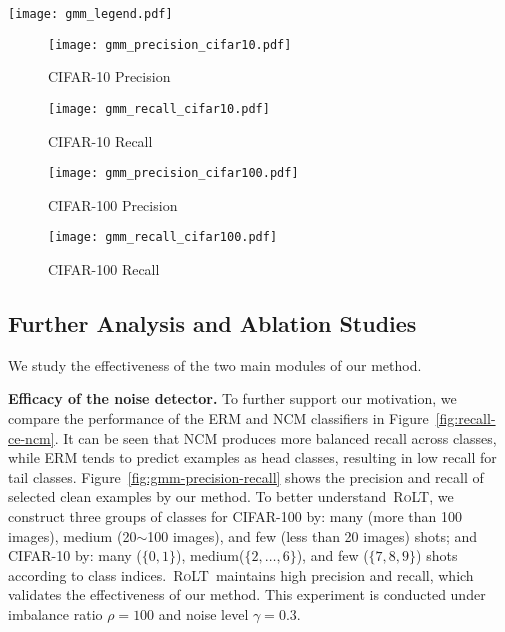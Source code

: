 \documentclass{article}
\def\algo{{\textsc{RoLT}}}
\begin{document}
\vspace{-0.25cm}
\begin{figure*}[h]
    \centering
    \texttt{[image: gmm\_legend.pdf]}
    
    \begin{subfigure}[b]{0.24\textwidth}
        \centering
        \texttt{[image: gmm\_precision\_cifar10.pdf]}
        \caption{CIFAR-10 Precision}
        \label{fig:gmm_precision_cifar10}
    \end{subfigure}
    \begin{subfigure}[b]{0.24\textwidth}
        \centering
        \texttt{[image: gmm\_recall\_cifar10.pdf]} 
        \caption{CIFAR-10 Recall}\label{fig:gmm_recall_cifar10}
    \end{subfigure}
    \begin{subfigure}[b]{0.24\textwidth}
        \centering
        \texttt{[image: gmm\_precision\_cifar100.pdf]} 
        \caption{CIFAR-100 Precision}\label{fig:gmm_precision_cifar100}
    \end{subfigure}
    \begin{subfigure}[b]{0.24\textwidth}
        \centering
        \texttt{[image: gmm\_recall\_cifar100.pdf]} 
        \caption{CIFAR-100 Recall}\label{fig:gmm_recall_cifar100}
    \end{subfigure}
    \caption{Precision and Recall of selected clean examples by our method.}
    \label{fig:gmm-precision-recall}
\end{figure*}
\vspace{-0.2cm}




\subsection{Further Analysis and Ablation Studies}
We study the effectiveness of the two main modules of our method.

\textbf{Efficacy of the noise detector.}
To further support our motivation, we compare the performance of the ERM and NCM classifiers in Figure~\ref{fig:recall-ce-ncm}. It can be seen that NCM produces more balanced recall across classes, while ERM tends to predict examples as head classes, resulting in low recall for tail classes. Figure~\ref{fig:gmm-precision-recall} shows the precision and recall of selected clean examples by our method. To better understand~\algo, we construct three groups of classes for CIFAR-100 by: many (more than 100 images), medium (20$\sim$100 images), and few (less than 20 images) shots; and CIFAR-10 by: many ($\{0,1\}$), medium($\{2,\dots,6\}$), and few ($\{7,8,9\}$) shots according to class indices.~\algo~maintains high precision and recall, which validates the effectiveness of our method. This experiment is conducted under imbalance ratio $\rho=100$ and noise level $\gamma =0.3$.
\end{document}
